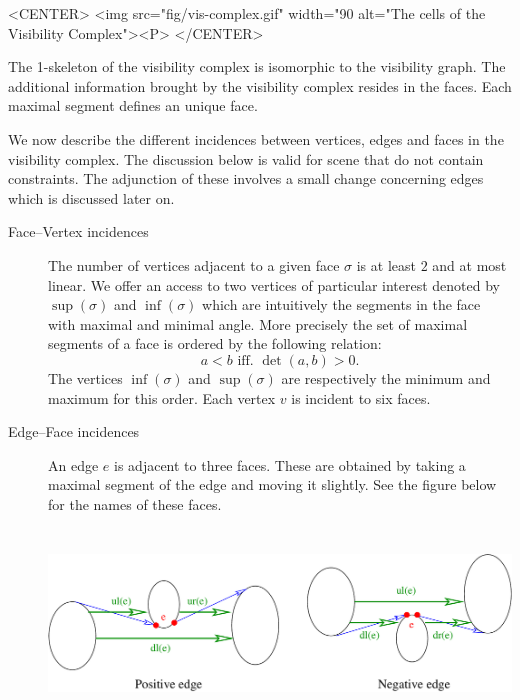 \begin{ccHtmlOnly}
    <CENTER>
        <img src="fig/vis-complex.gif" width="90%
         alt="The cells of the Visibility Complex"><P>
    </CENTER>
\end{ccHtmlOnly}

The 1-skeleton of the visibility complex is isomorphic to the visibility graph.
The additional information brought by the visibility complex resides in the
faces. Each maximal segment defines an unique face.

We now describe the different incidences between vertices, edges and faces in
the visibility complex. The discussion below is valid for scene that do not
contain constraints. The adjunction of these involves a small change concerning
edges which is discussed later on.
\begin{description}
    \item[{Face--Vertex incidences}]  The number of vertices adjacent
    to a given face $\sigma$ is at least $2$ and at most linear. We offer
    an access to two vertices of particular interest denoted by
    $\sup(\sigma)$ and $\inf(\sigma)$ which are intuitively the segments in
    the face with maximal and minimal angle. More precisely the set of
    maximal segments of a face is ordered by the following relation:
    \begin{equation}
                    a < b \textrm{ iff. } \det(a,b) > 0.
    \end{equation}
    The vertices $\inf(\sigma)$ and $\sup(\sigma)$ are respectively the minimum
    and maximum for this order. 
    Each vertex $v$ is incident to six faces. 
    \item[{Edge--Face incidences}]  An edge $e$ is adjacent to three
    faces. These are obtained by taking a maximal segment of the edge and
    moving it slightly. See the figure below for the names of these faces.

    \begin{ccTexOnly}
        \begin{center}
            \includegraphics[height=5cm,width=\linewidth]{Visibility_complex_2/fig/edge-face}%
        \end{center}
    \end{ccTexOnly}


\end{description}
